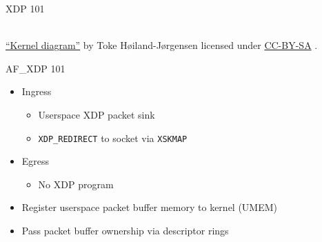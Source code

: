 \documentclass[aspectratio=169, xcolor=table]{beamer}
\begin{document}
  \begin{frame}{XDP 101}
  \begin{center}
  \\
    \vfill
  {\fontsize{3pt}{3pt}\selectfont \href{https://github.com/tohojo/xdp-paper/blob/master/figures/kernel-diagram.svg}{``Kernel diagram''} by Toke Høiland-Jørgensen licensed under \href{http://creativecommons.org/licenses/by-sa/4.0/}{CC-BY-SA} \ccbysa.}
  \end{center}
  \end{frame}

  \begin{frame}{AF\_XDP 101}
    \begin{itemize}
    \item Ingress
      \begin{itemize}
      \item Userspace XDP packet sink
      \item {\tt XDP\_REDIRECT} to socket via {\tt XSKMAP}
      \end{itemize}
    \item Egress
      \begin{itemize}
      \item No XDP program
      \end{itemize}
    \item Register userspace packet buffer memory to kernel (UMEM)
    \item Pass packet buffer ownership via descriptor rings
    \end{itemize}
  \end{frame}
\end{document}
